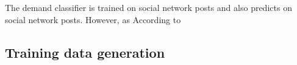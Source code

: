 The demand classifier is trained on social network posts and also predicts on social network posts.
However, as 
According to 


\subsection{Training data generation}


